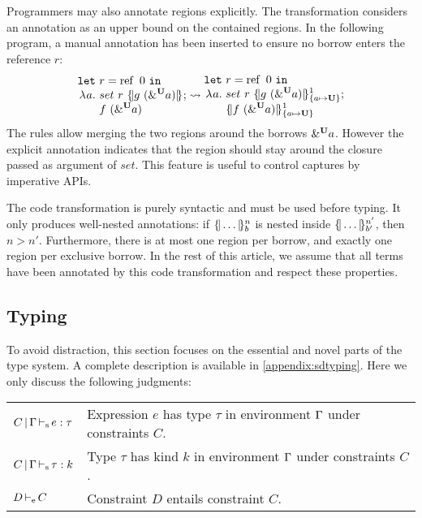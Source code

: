 Programmers may also annotate regions explicitly.
The transformation considers an annotation as an
upper bound on the contained regions.
In the following program, a manual annotation has been inserted to ensure
no borrow enters the reference $r$:
%
\[
  \setlength{\jot}{-1pt}
  \RannotT{
\begin{aligned}
  \letin{&r}{\operatorname{ref}\ 0}{}\\
  \lam{a}{}\ &
  set\ r\ \region[]{}{g\ (\borrow[\kun]{a})};\\
  &f\ (\borrow[\kun]{a})
\end{aligned}
}{
\begin{aligned}
  \letin{&r}{\operatorname{ref}\ 0}{}\\
  \lam{a}{}\ &
  set\ r\ \region[1]{\Sone a\IBORROW}{g\ (\borrow[\kun]{a})};\\
  &\region[1]{\Sone a\IBORROW}{f\ (\borrow[\kun]{a})}
\end{aligned}
}
\]
%
The rules allow merging the two regions around the borrows
$\borrow[\kun]{a}$. However
the explicit annotation indicates that the region should stay around the closure
passed as argument of $set$. This feature is useful to control captures
by imperative APIs.

The code transformation is purely syntactic and must be used before
typing. It only produces well-nested annotations: if $\region[n]{b}{\dots}$
is nested inside $\region[n']{b'}{\dots}$, then $n > n'$. Furthermore, there
is at most one region per borrow, and exactly one region per exclusive borrow.
In the rest of this article, we assume
that all terms have been annotated by this code transformation and respect
these properties.

\subsection{Typing}
\label{sdtyping}

To avoid distraction, this section focuses on the essential and novel
parts of the type system. A complete 
description is available in \cref{appendix:sdtyping}.
%
Here we only discuss the following judgments:
\begin{flushleft}
  \begin{tabular}{l@{ --- }l}
    $\inferS{C}{\E}{e}{\tau}$&
                               Expression $e$ has type $\tau$ in
                               environment $\E$ under constraints
                        $C$. \\
    $\inferSK{C}{\E}{\tau}{k}$&
                                Type $\tau$ has kind $k$ in
                                environment $\E$ under constraints
                                $C$. \\
    $\entail{D}{C}$ & Constraint $D$ entails constraint $C$.
  \end{tabular}
\end{flushleft}

